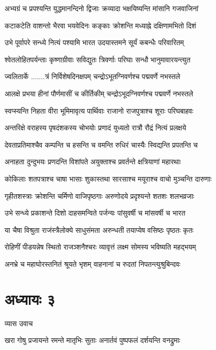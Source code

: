 \twolineshloka
{अभ्यग्रं च प्रपश्यन्ति युद्धमानन्दिनो द्विजाः}
{क्रव्यादा भक्षयिष्यन्ति मांसानि गजवाजिनां}


\twolineshloka
{कटाकटेति वाशन्तो भैरवा भयवेदिनः}
{कङ्काः क्रोशन्ति मध्याह्ने दक्षिणामभितो दिशं}


\twolineshloka
{उभे पूर्वापरे सन्ध्ये नित्यं पश्यामि भारत}
{उदयास्तमने सूर्यं कबन्धैः परिवारितम्}


\twolineshloka
{श्वेतलोहितपर्यन्ताः कृष्णाग्रीवाः सविद्युतः}
{त्रिवर्णाः परिघाः सन्धौ भानुमावारयन्त्युत}


\threelineshloka
{ज्वलितार्के .......त्रं निर्विशेषदिनक्षपम्}
{चन्द्रोऽभूतग्निवर्णश्च पद्मवर्णे नभस्तले}
{}


\twolineshloka
{आलक्षे प्रभया हीनां पौर्णमासीं च कीर्तिकीम्}
{चन्द्रोऽभूदग्निवर्णश्च पद्मवर्णे नभस्तले}


\twolineshloka
{स्वप्स्यन्ति निहता वीरा भूमिमावृत्य पार्थिवाः}
{राजानो राजपुत्राश्च शूराः परिघबाहवः}


\twolineshloka
{अन्तरिक्षे वराहस्य पृषदंशकस्य चोभयोः}
{प्रणादं युध्यतो रात्रौ रौद्रं नित्यं प्रलक्षये}


\twolineshloka
{देवताप्रतिमाश्चैव कम्पन्ति च हसन्ति च}
{वमन्ति रुधिरं चास्यैः स्विद्यन्ति प्रपतन्ति च}


\twolineshloka
{अनाहता दुन्दुभयः प्रणदन्ति विशांपते}
{अयुक्ताश्च प्रवर्तन्ते क्षत्रियाणां महारथाः}


\twolineshloka
{कोकिलाः शतपत्राश्च चाषा भासाः शुकास्तथा}
{सारसाश्च मयूराश्च वाचो मुञ्चन्ति दारुणाः}


\twolineshloka
{गृहीतशस्त्राः क्रोशन्ति चर्मिणो वाजिपृष्ठगाः}
{अरुणोदये प्रदृश्यन्ते शतशः शलभव्रजाः}


\twolineshloka
{उभे सन्ध्ये प्रकाशन्ते दिशो दाहसमन्विते}
{पर्जन्यः पांसुवर्षी च मांसवर्षी च भारत}


\twolineshloka
{या चैषा विश्रुता राजंस्त्रैलोक्ये साधुसंमता}
{अरुन्धती तयाप्येष वसिष्ठः पृष्ठतः कृतः}


\twolineshloka
{रोहिणीं पीडयन्नेष स्थितो राजञ्शनैश्चरः}
{व्यावृत्तं लक्ष्म सोमस्य भविष्यति महद्भयम्}


\twolineshloka
{अनभ्रे च महाघोरस्तनितं श्रूयते भृशम्}
{वाहनानां च रुदतां निपतन्त्युश्रुबिन्दवः}


\chapter{अध्यायः ३}
\twolineshloka
{व्यास उवाच}
{}


\twolineshloka
{खरा गोषु प्रजायन्ते रमन्ते मातृभिः सुताः}
{अनार्तवं पुष्पफलं दर्शयन्ति वनद्रुमाः}



